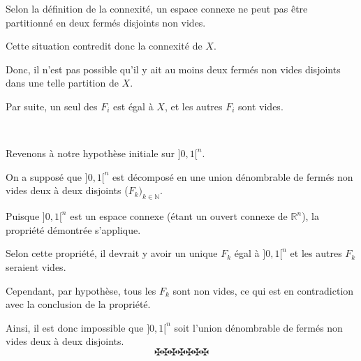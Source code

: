 Selon la d{\'e}finition de la connexit{\'e}, un espace connexe ne peut pas
{\^e}tre partitionn{\'e} en deux ferm{\'e}s disjoints non vides.

Cette situation contredit donc la connexit{\'e} de $X$.

Donc, il n'est pas possible qu'il y ait au moins deux ferm{\'e}s non vides
disjoints dans une telle partition de $X$.

Par suite, un seul des $F_i$ est {\'e}gal {\`a} $X$, et les autres $F_i$ sont
vides.

\

Revenons {\`a} notre hypoth{\`e}se initiale sur $] 0, 1 [^n$.

On a suppos{\'e} que $] 0, 1 [^n$ est d{\'e}compos{\'e} en une union
d{\'e}nombrable de ferm{\'e}s non vides deux {\`a} deux disjoints ($F_k)_{k
\in \mathbb{N}}$.

Puisque $] 0, 1 [^n$ est un espace connexe ({\'e}tant un ouvert connexe de
$\mathbb{R}^n$), la propri{\'e}t{\'e} d{\'e}montr{\'e}e s'applique.

Selon cette propri{\'e}t{\'e}, il devrait y avoir un unique $F_k$ {\'e}gal
{\`a} $] 0, 1 [^n$ et les autres $F_k$ seraient vides.

Cependant, par hypoth{\`e}se, tous les $F_k$ sont non vides, ce qui est en
contradiction avec la conclusion de la propri{\'e}t{\'e}.

Ainsi, il est donc impossible que $] 0, 1 [^n$ soit l'union d{\'e}nombrable de
ferm{\'e}s non vides deux {\`a} deux disjoints.
\[ \maltese \maltese \maltese \maltese \maltese \maltese \maltese \]
